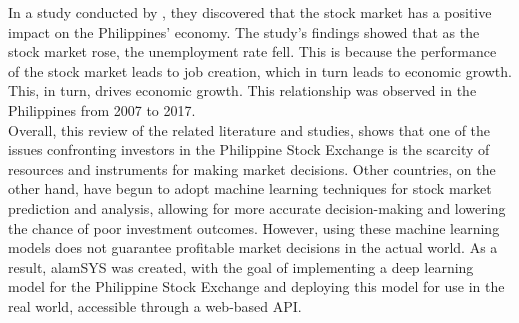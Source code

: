 In a study conducted by , they discovered that the stock market
has a positive impact on the Philippines' economy. The study's findings showed that
as the stock market rose, the unemployment rate fell. This is because the performance 
of the stock market leads to job creation, which in turn leads to economic growth.
This, in turn, drives economic growth. This relationship was observed
in the Philippines from 2007 to 2017.
\\

Overall, this review of the related literature and studies, shows that one of the issues 
confronting investors in the Philippine Stock Exchange is the scarcity of resources and 
instruments for making market decisions. Other countries, on the other hand, have begun to 
adopt machine learning techniques for stock market prediction and analysis, allowing for 
more accurate decision-making and lowering the chance of poor investment outcomes. 
However, using these machine learning models does not guarantee profitable market decisions in 
the actual world. As a result, alamSYS was created, with the goal of implementing a deep 
learning model for the Philippine Stock Exchange and deploying this model for use in the 
real world, accessible through a web-based API.
\\

